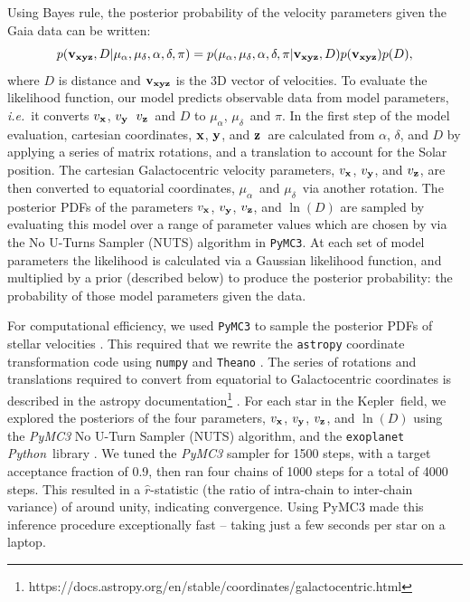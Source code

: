 \documentclass[]{aastex631}
\newcommand{\ie}{{\it i.e.}}
\newcommand{\kepler}{{Kepler}}
\newcommand{\vx}{$v_{\bf x}$}
\newcommand{\vy}{$v_{\bf y}$}
\newcommand{\vz}{$v_{\bf z}$}
\newcommand{\x}{${\bf x}$}
\newcommand{\y}{${\bf y}$}
\newcommand{\z}{${\bf z}$}
\newcommand{\pmra}{$\mu_\alpha$}
\newcommand{\pmdec}{$\mu_\delta$}
\newcommand{\parallax}{$\pi$}
\newcommand{\ra}{$\alpha$}
\newcommand{\dec}{$\delta$}
\newcommand{\python}{{\it Python}}
\begin{document}
Using Bayes rule, the posterior probability of the velocity parameters given
the Gaia data can be written:
\begin{equation}
    p({\bf v_{xyz}}, D | \mu_{\alpha}, \mu_{\delta}, \alpha, \delta, \pi) =
    p(\mu_{\alpha}, \mu_{\delta}, \alpha, \delta, \pi | {\bf v_{xyz}}, D)
    p({\bf v_{xyz}}) p(D),
\end{equation}
where $D$ is distance and ${\bf v_{xyz}}$ is the 3D vector of velocities.
To evaluate the likelihood function, our model predicts observable data from
model parameters, \ie\ it converts \vx, \vy\, \vz\ and $D$ to \pmra, \pmdec\
and \parallax.
In the first step of the model evaluation, cartesian coordinates, \x, \y, and
\z\, are calculated from \ra, \dec, and $D$ by applying a series of matrix
rotations, and a translation to account for the Solar position.
The cartesian Galactocentric velocity parameters, \vx, \vy, and \vz, are then
converted to equatorial coordinates, \pmra\ and \pmdec\ via another rotation.
The posterior PDFs of the parameters \vx, \vy, \vz, and $\ln(D)$ are sampled
by evaluating this model over a range of parameter values which are chosen by
via the No U-Turns Sampler (NUTS) algorithm in {\tt PyMC3}.
At each set of model parameters the likelihood is calculated via a Gaussian
likelihood function, and multiplied by a prior (described below) to produce
the posterior probability: the probability of those model parameters given the
data.

For computational efficiency, we used {\tt PyMC3} to sample the posterior PDFs
of stellar velocities \citep{pymc3}.
This required that we rewrite the {\tt astropy} coordinate transformation code
using {\tt numpy} and {\tt Theano} \citep{numpy, theano}.
The series of rotations and translations required to convert from equatorial
to Galactocentric coordinates is described in the astropy
documentation\footnote{
    https://docs.astropy.org/en/stable/coordinates/galactocentric.html }
\citep{astropy2018}.
For each star in the \kepler\ field, we explored the posteriors of the four
parameters, \vx, \vy, \vz, and $\ln(D)$ using the {\it PyMC3} No U-Turn
Sampler (NUTS) algorithm, and the {\tt exoplanet} \python\ library
\citep{exoplanet}.
We tuned the {\it PyMC3} sampler for 1500 steps, with a target acceptance
fraction of 0.9, then ran four chains of 1000 steps for a total of 4000 steps.
This resulted in a $\hat{r}$-statistic (the ratio of intra-chain to
inter-chain variance) of around unity, indicating convergence.
Using PyMC3 made this inference procedure exceptionally fast -- taking just a
few seconds per star on a laptop.
\end{document}
